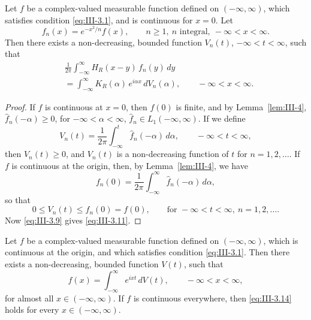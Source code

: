 \begin{lemma}\label{lem:III-6}
Let $f$ be a complex-valued measurable function defined on $(-\infty,\infty)$, which satisfies condition \eqref{eq:III-3.1}, and is continuous for $x=0$. Let
\begin{equation}\tag{3.10}\label{eq:III-3.10}
f_{n}(x)=e^{-x^{2}/n}f(x),\qquad n\ge1,\ n\text{ integral},\ -\infty<x<\infty.
\end{equation}
Then there exists a non-decreasing, bounded function $V_{n}(t)$, $-\infty<t<\infty$, such that
\begin{equation}\tag{3.11}\label{eq:III-3.11}
\begin{aligned}
&\frac{1}{2\pi}  \int_{-\infty}^{\infty}H_{R}(x-y)\,f_{n}(y)\,dy\\
&= \int_{-\infty}^{\infty}K_{R}(\alpha)\,e^{i\alpha x}\,dV_{n}(\alpha),  \qquad - \infty < x < \infty.
\end{aligned}
\end{equation}
\end{lemma}

\begin{proof}
If $f$ is continuous at $x=0$, then $f(0)$ is finite, and by Lemma~\ref{lem:III-4}, $\hat f_{n}(-\alpha)\ge0$, for $-\infty<\alpha<\infty$, $\hat f_{n}\in L_{1}(-\infty,\infty)$. If we define
\begin{equation}\tag{3.12}\label{eq:III-3.12}
V_{n}(t)=\frac{1}{2\pi}\int_{-\infty}^{t}\hat f_{n}(-\alpha)\,d\alpha,\qquad-\infty<t<\infty,
\end{equation}
then $V_{n}(t)\ge0$, and $V_{n}(t)$ is a non-decreasing function of $t$ for $n=1,2,\dots$. If $f$ is continuous at the origin, then, by Lemma~\ref{lem:III-4}, we have
\[
f_{n}(0)=\frac{1}{2\pi}\int_{-\infty}^{\infty}\hat f_{n}(-\alpha)\,d\alpha,
\]
so that
\begin{equation}\tag{3.13}\label{eq:III-3.13}
0\le V_{n}(t)\le f_{n}(0)=f(0),\qquad\text{for }-\infty<t<\infty,\ n=1,2,\dots.
\end{equation}
Now \eqref{eq:III-3.9} gives \eqref{eq:III-3.11}.
\end{proof}

\begin{theorem}\label{thm:III-5}
Let $f$ be a complex-valued measurable function defined on $(-\infty,\infty)$, which is continuous at the origin, and which satisfies condition \eqref{eq:III-3.1}. Then there exists a non-decreasing, bounded function $V(t)$, such that
\begin{equation}\tag{3.14}\label{eq:III-3.14}
f(x)=\int_{-\infty}^{\infty}e^{ixt}\,dV(t),\qquad-\infty<x<\infty,
\end{equation}
for almost all $x\in(-\infty,\infty)$. If $f$ is continuous everywhere, then \eqref{eq:III-3.14} holds for every $x\in(-\infty,\infty)$.
\end{theorem}

